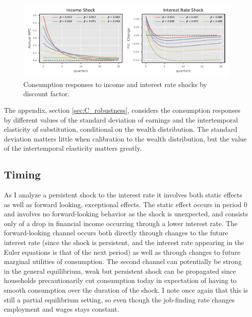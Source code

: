 


\begin{figure}[H]
\centering
\includegraphics[width=.98\linewidth]{mainmatter/plots/SS_evaluation/Alternative_calibs/beta_dR_dI.pdf} 
\caption{Consumption responses to income and interest rate shocks by discount factor.}
\label{fig:calibration_C_r_beta}
\end{figure}


The appendix, section \ref{sec:C_robustness}, considers the consumption responses by different values of the standard deviation of earnings and the intertemporal elasticity of substitution, conditional on the wealth distribution. The standard deviation matters little when calibration to the wealth distribution, but the value of the intertemporal elasticity matters greatly. 



\subsection{Timing} 
As I analyze a persistent shock to the interest rate it involves both static effects as well as forward looking, exceptional effects. The static effect occurs in period 0 and involves no forward-looking behavior as the shock is unexpected, and consists only of a drop in financial income occurring through a lower interest rate. The forward-looking channel occurs both directly through changes to the future interest rate (since the shock is persistent, and the interest rate appearing in the Euler equations is that of the next period) as well as through changes to future marginal utilities of consumption. The second channel can potentially be strong in the general equilibrium, weak but persistent shock can be propagated since households precautionarily cut consumption today in expectation of having to smooth consumption over the duration of the shock.
I note once again that this is still a partial equilibrium setting, so even though the job-finding rate changes employment and wages stays constant. 
 

